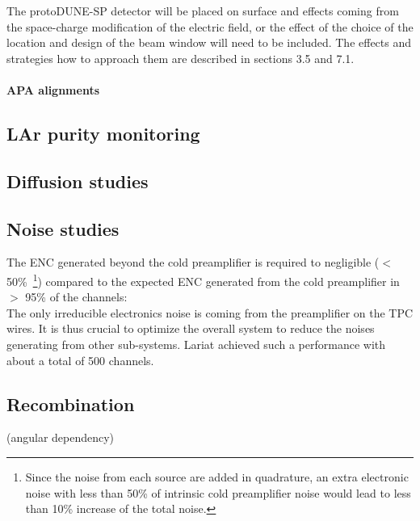 
The protoDUNE-SP detector will be placed on surface and effects coming from the space-charge modification of the electric field, or the effect of the choice of the location and design of the beam window will need to be included. The effects and strategies how to approach them are described in sections 3.5 and 7.1.
		
		\paragraph{APA alignments}

	\subsection{LAr purity monitoring}

	\subsection{Diffusion studies}

	\subsection{Noise studies}
  
  The ENC generated beyond the cold preamplifier is required to negligible ($<$ 50\%~\footnote{Since the noise from each source are added in quadrature, an extra electronic noise with less than 50\% of intrinsic cold preamplifier
noise would lead to less than 10\% increase of the total noise.}) compared to the 
expected ENC generated from the cold preamplifier in $>$ 95\% of the channels: \\
The only irreducible electronics noise is coming from the preamplifier on the TPC wires. It is thus
crucial to optimize the overall system to reduce the noises generating from other sub-systems. 
Lariat achieved such a performance with about a total of 500 channels. 


	\subsection{Recombination}
	 (angular dependency)


